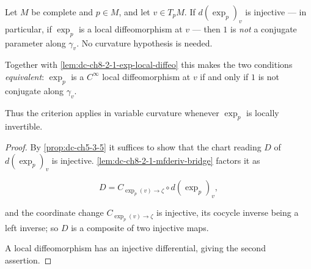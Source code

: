 \begin{lemma}
  \label{lem:dc-ch8-2-1-no-conjugate-normal}
  \leanok
  Let $M$ be complete and $p\in M$, and let $v\in T_pM$. If $d(\exp_p)_v$ is injective --- in
  particular, if $\exp_p$ is a local diffeomorphism at $v$ --- then $1$ is \emph{not} a conjugate
  parameter along $\gamma_v$. No curvature hypothesis is needed.

  Together with \cref{lem:dc-ch8-2-1-exp-local-diffeo} this makes the two conditions
  \emph{equivalent}: $\exp_p$ is a $C^\infty$ local diffeomorphism at $v$ if and only if $1$ is
  not conjugate along $\gamma_v$.

  Thus the criterion applies in variable curvature whenever $\exp_p$ is locally invertible.
\end{lemma}
\begin{proof}
  \leanok
\sketch
  By \cref{prop:dc-ch5-3-5} it suffices to show that the chart reading $D$ of $d(\exp_p)_v$ is
  injective. \cref{lem:dc-ch8-2-1-mfderiv-bridge} factors it as

  $$
  D = C_{\exp_p(v)\to\zeta}\circ d(\exp_p)_v ,
  $$

  and the coordinate change $C_{\exp_p(v)\to\zeta}$ is injective, its cocycle inverse being a left
  inverse; so $D$ is a composite of two injective maps.

  A local diffeomorphism has an injective differential, giving the second assertion.
\end{proof}


